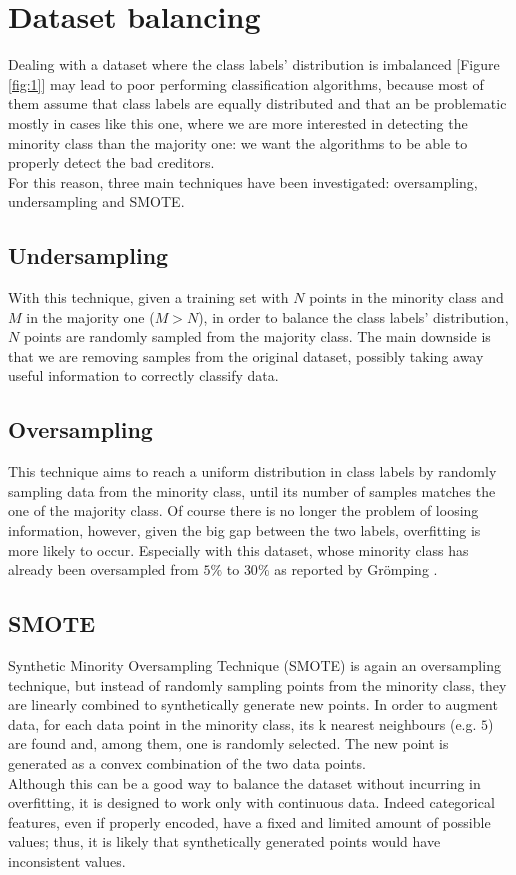 \documentclass[letterpaper]{article}
\begin{document}
	\section{Dataset balancing} \label{dataset_balancing}
	Dealing with a dataset where the class labels' distribution is imbalanced [Figure \ref{fig:1}] may lead to poor performing classification algorithms, because most of them assume that class labels are equally distributed and that an be problematic mostly in cases like this one, where we are more interested in detecting the minority class than the majority one: we want the algorithms to be able to properly detect the bad creditors.\\
	For this reason, three main techniques have been investigated: oversampling, undersampling and SMOTE.
	\subsection{Undersampling}
	With this technique, given a training set with $N$ points in the minority class and $M$ in the majority one ($M > N$), in order to balance the class labels' distribution, $N$ points are randomly sampled from the majority class. The main downside is that we are removing samples from the original dataset, possibly taking away useful information to correctly classify data.
	\subsection{Oversampling}
	This technique aims to reach a uniform distribution in class labels by randomly sampling data from the minority class, until its number of samples matches the one of the majority class. Of course there is no longer the problem of loosing information, however, given the big gap between the two labels, overfitting is more likely to occur. Especially with this dataset, whose minority class has already been oversampled from $5\%$ to $30\%$ as reported by Grömping \cite{gromping}.
	\subsection{SMOTE}
	Synthetic Minority Oversampling Technique (SMOTE) is again an oversampling technique, but instead of randomly sampling points from the minority class, they are linearly combined to synthetically generate new points. In order to augment data, for each data point in the minority class, its k nearest neighbours (e.g. $5$) are found and, among them, one is randomly selected. The new point is generated as a convex combination of the two data points. \\
	Although this can be a good way to balance the dataset without incurring in overfitting, it is designed to work only with continuous data. Indeed categorical features, even if properly encoded, have a fixed and limited amount of possible values; thus, it is likely that synthetically generated points would have inconsistent values. 
	
\end{document}
